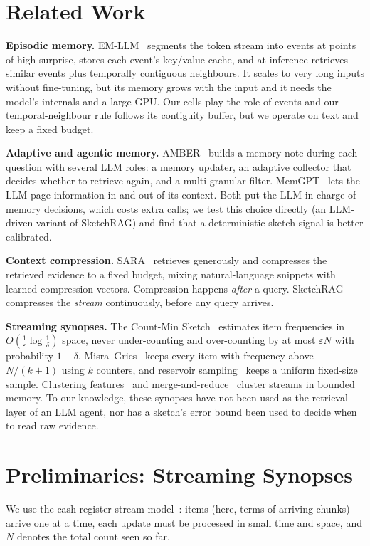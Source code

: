 \documentclass[conference,10pt]{IEEEtran}
\begin{document}
\section{Related Work}
\textbf{Episodic memory.} EM-LLM~\cite{fountas2025emllm} segments the token stream into events at points of high
surprise, stores each event's key/value cache, and at inference retrieves similar events plus temporally contiguous
neighbours. It scales to very long inputs without fine-tuning, but its memory grows with the input and it needs the
model's internals and a large GPU. Our cells play the role of events and our temporal-neighbour rule follows its
contiguity buffer, but we operate on text and keep a fixed budget.

\textbf{Adaptive and agentic memory.} AMBER~\cite{qin2025amber} builds a memory note during each question with several
LLM roles: a memory updater, an adaptive collector that decides whether to retrieve again, and a multi-granular
filter. MemGPT~\cite{packer2023memgpt} lets the LLM page information in and out of its context. Both put the LLM in
charge of memory decisions, which costs extra calls; we test this choice directly (an LLM-driven variant of
SketchRAG) and find that a deterministic sketch signal is better calibrated.

\textbf{Context compression.} SARA~\cite{jin2026sara} retrieves generously and compresses the retrieved evidence to a
fixed budget, mixing natural-language snippets with learned compression vectors. Compression happens \emph{after} a
query. SketchRAG compresses the \emph{stream} continuously, before any query arrives.

\textbf{Streaming synopses.} The Count-Min Sketch~\cite{cormode2005countmin} estimates item frequencies in
$O(\frac{1}{\varepsilon}\log\frac{1}{\delta})$ space, never under-counting and over-counting by at most $\varepsilon N$
with probability $1-\delta$. Misra--Gries~\cite{misra1982repeated} keeps every item with frequency above
$N/(k{+}1)$ using $k$ counters, and reservoir sampling~\cite{vitter1985reservoir} keeps a uniform fixed-size sample.
Clustering features~\cite{zhang1996birch} and merge-and-reduce~\cite{guha2003clustering} cluster streams in bounded
memory. To our knowledge, these synopses have not been used as the retrieval layer of an LLM agent, nor has a sketch's
error bound been used to decide when to read raw evidence.

\section{Preliminaries: Streaming Synopses}
We use the cash-register stream model~\cite{muthukrishnan2005streams}: items (here, terms of arriving chunks) arrive
one at a time, each update must be processed in small time and space, and $N$ denotes the total count seen so far.
\end{document}
